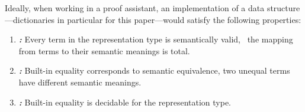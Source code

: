 



Ideally, when working in a proof assistant, an implementation of a data structure---dictionaries in particular for this paper---would satisfy the following properties:

\newcommand{\designGoal}[1]
  {\textbf{\emph{#1:}}}

\begin{enumerate}

\item
%
\designGoal{\SemTot}
%
Every term in the representation type is semantically valid, \ie{}~the mapping from terms to their semantic meanings is total.

\item
%
\designGoal{\SemInj}
%
Built-in equality corresponds to semantic equivalence, \ie{} two unequal terms have different semantic meanings.

\item
%
\designGoal{\EqDec}
%
Built-in equality is decidable for the representation type.

\end{enumerate}

